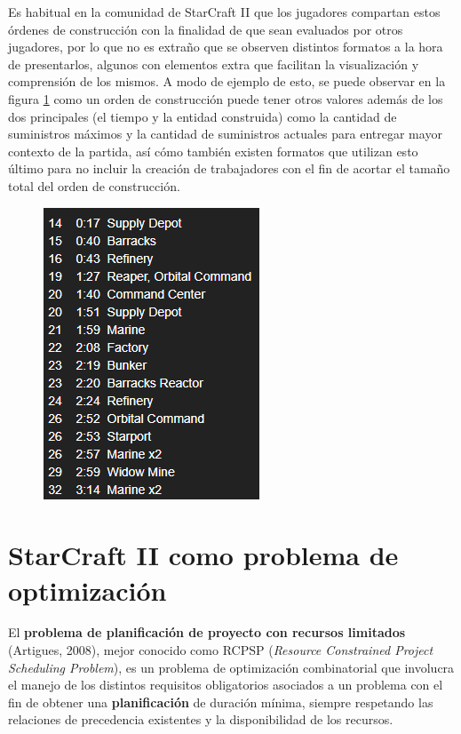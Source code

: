 Es habitual en la comunidad de StarCraft II que los jugadores compartan estos órdenes de construcción con la finalidad de que sean evaluados por otros jugadores, por lo que no es extraño que se observen distintos formatos a la hora de presentarlos, algunos con elementos extra que facilitan la visualización y comprensión de los mismos. A modo de ejemplo de esto, se puede observar en la figura {\ref{fig:1}} como un orden de construcción puede tener otros valores además de los dos principales (el tiempo y la entidad construida) como la cantidad de suministros máximos y la cantidad de suministros actuales para entregar mayor contexto de la partida, así cómo también existen formatos que utilizan esto último para no incluir la creación de trabajadores con el fin de acortar el tamaño total del orden de construcción.

\begin{figure}[H]
	\centering
	\captionsetup{justification=centering}
	\includegraphics[keepaspectratio]{images/1.png}
	\label{fig:1}
\end{figure}

\section{StarCraft II como problema de optimización}

El \textbf{problema de planificación de proyecto con recursos limitados} (Artigues, 2008), mejor conocido como RCPSP (\textit{Resource Constrained Project Scheduling Problem}), es un problema de optimización combinatorial que involucra el manejo de los distintos requisitos obligatorios asociados a un problema con el fin de obtener una \textbf{planificación} de duración mínima, siempre respetando las relaciones de precedencia existentes y la disponibilidad de los recursos.

